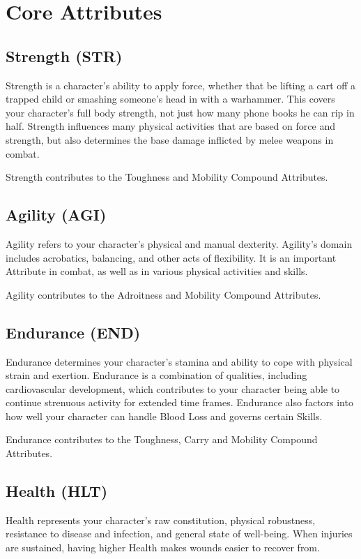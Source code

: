 \documentclass[oneside,11pt,english]{book}
\begin{document}
\section{Core Attributes}
\subsection*{Strength (STR)}
Strength is a character's ability to apply force, whether that be lifting a cart off a trapped child or 
smashing someone's head in with a warhammer. This covers your character’s full body strength, not just 
how many phone books he can rip in half. Strength influences many physical activities that are based on 
force and strength, but also determines the base damage inflicted by melee weapons in combat. 


Strength contributes to the Toughness and Mobility Compound Attributes.
\subsection*{Agility (AGI)} 
Agility refers to your character’s physical and manual dexterity. Agility’s domain includes acrobatics, 
balancing, and other acts of flexibility. It is an important Attribute in combat, as well as in various 
physical activities and skills. 


Agility contributes to the Adroitness and Mobility Compound Attributes. 
\subsection*{Endurance (END)}
Endurance determines your character’s stamina and ability to cope with physical strain and exertion. 
Endurance is a combination of qualities, including cardiovascular development, which contributes to your 
character being able to continue strenuous activity for extended time frames. Endurance also factors into 
how well your character can handle Blood Loss and governs certain Skills. 

Endurance contributes to the Toughness, Carry and Mobility Compound Attributes. 
\subsection*{Health (HLT)}
Health represents your character's raw constitution, physical robustness, resistance to disease and 
infection, and general state of well-being. When injuries are sustained, having higher Health makes 
wounds easier to recover from. 
\end{document}

